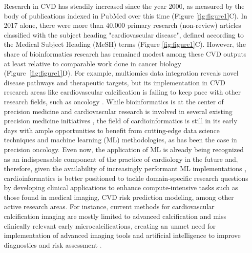 \documentclass[letter]{bib}
\newcounter{example}[subsection]
\begin{document}
Research in CVD has steadily increased since the year 2000, as measured by the body of publications indexed in PubMed over this time (Figure \ref{fig:figure1}C).  In 2017 alone, there were more than 40,000 primary research (non-review) articles classified with the subject heading "cardiovascular disease", defined according to the Medical Subject Heading (MeSH) terms (Figure \ref{fig:figure1}C).  However, the share of bioinformatics research has remained modest among these CVD outputs at least relative to comparable work done in cancer biology (Figure~\ref{fig:figure1}D). For example, multiomics data integration reveals novel disease pathways and therapeutic targets, but its implementation in CVD research areas like cardiovascular calcification is failing to keep pace with other research fields, such as oncology \citep{Rogers:2019:Cardiovascular}.  While bioinformatics is at the center of precision medicine \citep{Gomez-Lopez:2017:Precision} and cardiovascular research is involved in several existing precision medicine initiatives \citep{Houser:2016:American,czbiohub:2018:Chan}, the field of cardioinformatics is still in its early days with ample opportunities to benefit from cutting-edge data science techniques and machine learning (ML) methodologies, as has been the case in precision oncology. Even now, the application of ML is already being recognized as an indispensable component of the practice of cardiology in the future \citep{Shameer:2017:Translational,Shameer:2018:Machine} and, therefore, given the availability of increasingly performant ML implementations \citep{MLPerf:2018:MLPerf}, cardioinformatics is better positioned to tackle domain-specific research questions by developing clinical applications to enhance compute-intensive tasks such as those found in medical imaging, CVD risk prediction modeling, among other active research areas.  For instance, current methods for cardiovascular calcification imaging are mostly limited to advanced calcification and miss clinically relevant early microcalcifications, creating an unmet need for implementation of advanced imaging tools and artificial intelligence to improve diagnostics and risk assessment \citep{Rogers:2019:Cardiovascular}. 
\end{document}
